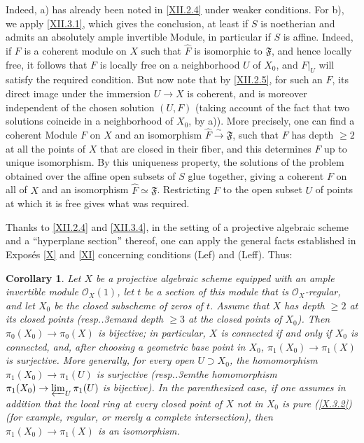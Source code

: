 \documentclass[11pt,a4paper,oneside]{book}
\providecommand{\sisi}[2]{#2}
\providecommand{\pageoriginale}{%
  \refstepcounter{pageoriginal}%
  \marginpar{\raggedright\footnotesize\bfseries\thepageoriginal}%
  \xspace}
\providecommand{\og}{``}
\providecommand{\fg}{''\xspace}
\providecommand{\resp}{resp.\kern.3em}
\providecommand{\formelF}{\mathfrak F}
\providecommand{\OX}{\mathcal O_X}
\providecommand{\isomto}{\overset{\sim}{\longrightarrow}}
\theoremstyle{plain}
\newtheorem{corollaire}[subsection]{Corollary}
\theoremstyle{definition}
\theoremstyle{remark}
\renewcommand{\Ref}[1]{\textup{\ref{#1}}}
\begin{document}
Indeed, a) has already been noted in \Ref{XII.2.4} under weaker conditions. For b), we apply \Ref{XII.3.1}, which gives the conclusion, at least if $S$ is noetherian and admits an absolutely ample invertible Module, in particular if $S$ is affine. Indeed, if $F$ is a coherent module on $X$ such that $\widehat{F}$ is isomorphic to $\formelF$, and hence locally free, it follows that $F$ is locally free on a neighborhood $U$ of $X_0$, and $\sisi{F|U}{F|_U}$ will satisfy the required condition. But now note that by \Ref{XII.2.5}, for such an $F$, its direct image under the immersion $U\to X$ is coherent, and is moreover independent of the chosen solution $(U, F)$ (taking account \sisi{\ignorespaces}{of the fact} that two solutions coincide in a neighborhood of $X_0$, by a)). More precisely, one can find a coherent Module $F$ on $X$ and an isomorphism $\widehat{F}\isomto \formelF$, such that $F$ has depth $\geq 2$ at all the points of $X$ that are closed in their fiber, and this determines $F$ up to unique isomorphism. By this uniqueness property, the solutions of the problem obtained over the affine open subsets of $S$ glue together, giving a coherent $F$ on all of $X$ and an isomorphism $\widehat{F}\simeq \formelF$. Restricting $F$ to the open subset $U$ of points at which it is free gives what was required.

Thanks\pageoriginale to \Ref{XII.2.4} and \Ref{XII.3.4}, in the setting of a projective algebraic scheme and a \og hyperplane section\fg thereof, one can apply the general facts established in Expos\'es \Ref{X} and \Ref{XI} concerning conditions (Lef) and (Leff). Thus:

\begin{corollaire} \label{XII.3.5} Let $X$ be a projective algebraic scheme equipped with an ample invertible module $\OX(1)$, let $t$ be a section of this module that is $\OX$-regular, and let $X_0$ be the closed subscheme of zeros of $t$. Assume that $X$ has depth $\geq 2$ at its closed points (\resp and depth $\geq 3$ at the closed points of $X_0$). Then $\pi_0(X_0)\to \pi_0(X)$ is bijective; in particular, $X$ is connected if and only if $X_0$ is connected, and, after choosing a geometric base point in $X_0$, $\pi_1(X_0)\to \pi_1(X)$ is surjective. More generally, for every open $U\supset X_0$, the homomorphism $\pi_1(X_0)\to \pi_1(U)$ is surjective (\resp the homomorphism $\pi_1(X_0)\to \varprojlim_U\pi_1(U)$ is bijective). In the parenthesized case, if one assumes in addition that the local ring at every closed point of $X$ not in $X_0$ is pure (\Ref{X.3.2}) (for example, regular, or merely a complete intersection), then $\pi_1(X_0)\to \pi_1(X)$ is an isomorphism.
\end{corollaire}
\end{document}
